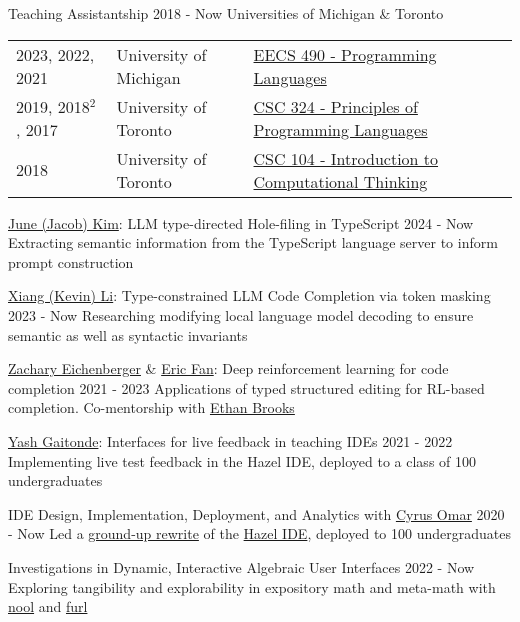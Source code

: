 \documentclass[10pt,a4paper]{article}
\begin{document}
  \headedsubsection
    {Teaching Assistantship}
    {2018 - Now \sbull Universities of Michigan \& Toronto}
    {\begin{tabular}{p{3.3cm} p{4.1cm}  l}
    2023, 2022, 2021 & University of Michigan &  \href{https://eecs490.github.io/eecs490.org/}{EECS 490 - Programming Languages} \\
      2019,  2018$^{2}$, 2017 & University of Toronto & 
      \href{https://www.cs.toronto.edu/~gfb/csc324/2017W/}{CSC 324 - Principles of Programming Languages} \\
    2018 & University of Toronto & \href{https://www.cs.toronto.edu/~gfb/csc104/2018F/}{CSC 104 - Introduction to Computational Thinking}
    \end{tabular}}



  \headedsubsection
    {\href{https://github.com/jpoly1219}{June (Jacob) Kim}: LLM type-directed Hole-filing in TypeScript}
    {2024 - Now}
    {Extracting semantic information from the TypeScript language server to inform prompt construction}

  \headedsubsection
    {\href{https://github.com/AlienKevin}{Xiang (Kevin) Li}: Type-constrained LLM Code Completion via token masking}
    {2023 - Now}
    {Researching modifying local language model decoding to ensure semantic as well as syntactic invariants}

  \headedsubsection
    {\href{https://github.com/ZachEichen}{Zachary Eichenberger} \& \href{https://github.com/yikai5518}{Eric Fan}: Deep reinforcement learning for code completion}
    {2021 - 2023}
    {Applications of typed structured editing for RL-based completion. Co-mentorship with \href{https://ethanabrooks.github.io/}{Ethan Brooks}}
  
  \headedsubsection
    {\href{https://yashgaitonde.com/}{Yash Gaitonde}: Interfaces for live feedback in teaching IDEs}
    {2021 - 2022}
    {Implementing live test feedback in the Hazel IDE, deployed to a class of 100 undergraduates}



  \headedsubsection
    {IDE Design, Implementation, Deployment, and Analytics with \href{https://web.eecs.umich.edu/~comar/}{Cyrus Omar}}
    {2020 - Now}
    {Led a \href{https://hazel.org/build/dev/}{ground-up rewrite} of the \href{https://hazel.org/}{Hazel IDE}, deployed to 100 undergraduates}

\headedsubsection
    {Investigations in Dynamic, Interactive Algebraic User Interfaces}
    {2022 - Now}
    {Exploring tangibility and explorability in expository math and meta-math  with \href{https://andrewblinn.com/nool/}{nool} and \href{https://andrewblinn.com/furl/main/}{furl}}
\end{document}

